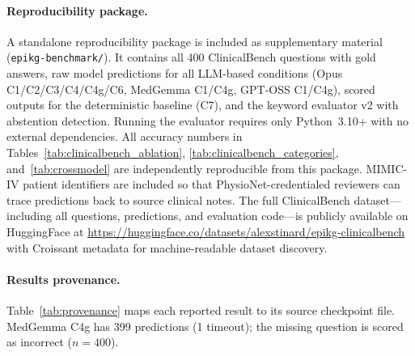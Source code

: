 \begin{sloppypar}
\paragraph{Reproducibility package.} A standalone reproducibility package is included as supplementary material (\texttt{epikg-benchmark/}). It contains all 400 ClinicalBench questions with gold answers, raw model predictions for all LLM-based conditions (Opus C1/C2/C3/C4/C4g/C6, MedGemma C1/C4g, GPT-OSS C1/C4g), scored outputs for the deterministic baseline (C7), and the keyword evaluator v2 with abstention detection. Running the evaluator requires only Python~3.10+ with no external dependencies. All accuracy numbers in Tables~\ref{tab:clinicalbench_ablation}, \ref{tab:clinicalbench_categories}, and~\ref{tab:crossmodel} are independently reproducible from this package. MIMIC-IV patient identifiers are included so that PhysioNet-credentialed reviewers can trace predictions back to source clinical notes.
The full ClinicalBench dataset---including all questions, predictions, and evaluation code---is publicly available on HuggingFace at \url{https://huggingface.co/datasets/alexstinard/epikg-clinicalbench} with Croissant metadata for machine-readable dataset discovery.
\end{sloppypar}

\paragraph{Results provenance.} Table~\ref{tab:provenance} maps each reported result to its source checkpoint file.
MedGemma C4g has 399 predictions (1 timeout); the missing question is scored as incorrect ($n=400$).

